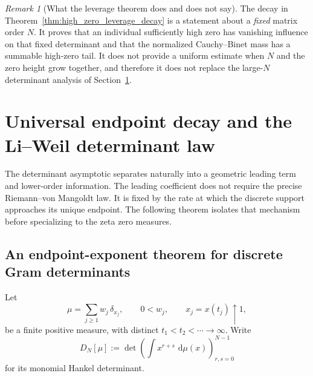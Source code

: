 \documentclass[11pt]{amsart}
\numberwithin{equation}{section}
\theoremstyle{plain}
\theoremstyle{definition}
\theoremstyle{remark}
\newtheorem{remark}[theorem]{Remark}
\newcommand{\dd}{\,\mathrm d}
\begin{document}
\begin{remark}[What the leverage theorem does and does not say]
\label{rem:leverage_scope}
The decay in Theorem~\ref{thm:high_zero_leverage_decay} is a statement about a \emph{fixed} matrix order $N$.  It proves that an individual sufficiently high zero has vanishing influence on that fixed determinant and that the normalized Cauchy--Binet mass has a summable high-zero tail.  It does not provide a uniform estimate when $N$ and the zero height grow together, and therefore it does not replace the large-$N$ determinant analysis of Section~\ref{sec:determinant_decay}.
\end{remark}

\section{Universal endpoint decay and the Li--Weil determinant law}
\label{sec:determinant_decay}

The determinant asymptotic separates naturally into a geometric leading term and lower-order information. The leading coefficient does not require the precise Riemann--von Mangoldt law. It is fixed by the rate at which the discrete support approaches its unique endpoint. The following theorem isolates that mechanism before specializing to the zeta zero measures.

\subsection{An endpoint-exponent theorem for discrete Gram determinants}

Let
\begin{equation}
\mu=\sum_{j\ge1}w_j\,\delta_{x_j},
\qquad
0<w_j,
\qquad
x_j=x(t_j)\uparrow1,
\label{eq:abstract_discrete_measure}
\end{equation}
be a finite positive measure, with distinct $t_1<t_2<\cdots\to\infty$. Write
\begin{equation}
D_N[\mu]
:=\det\left(\int x^{r+s}\,\dd\mu(x)\right)_{r,s=0}^{N-1}
\label{eq:abstract_hankel_determinant}
\end{equation}
for its monomial Hankel determinant.
\end{document}
